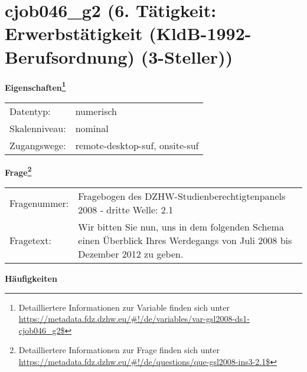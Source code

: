 
    \setcounter{footnote}{0}

    \vspace*{-1.8cm}
	\section{cjob046\_g2 (6. Tätigkeit: Erwerbstätigkeit (KldB-1992-Berufsordnung) (3-Steller))}
	\label{section:cjob046_g2}



    \vspace*{0.5cm}
    \noindent\textbf{Eigenschaften\footnote{Detailliertere Informationen zur Variable finden sich unter
		\url{https://metadata.fdz.dzhw.eu/\#!/de/variables/var-gsl2008-ds1-cjob046_g2$}}}\\
	\begin{tabularx}{\hsize}{@{}lX}
	Datentyp: & numerisch \\
	Skalenniveau: & nominal \\
	Zugangswege: &
	  remote-desktop-suf, 
	  onsite-suf
 \\
    \end{tabularx}



				\vspace*{0.5cm}
                \noindent\textbf{Frage\footnote{Detailliertere Informationen zur Frage finden sich unter
		              \url{https://metadata.fdz.dzhw.eu/\#!/de/questions/que-gsl2008-ins3-2.1$}}}\\
				\begin{tabularx}{\hsize}{@{}lX}
					Fragenummer: &
					  Fragebogen des DZHW-Studienberechtigtenpanels 2008 - dritte Welle:
					  2.1
 \\
					Fragetext: & Wir bitten Sie nun, uns in dem folgenden Schema einen Überblick Ihres Werdegangs von Juli 2008 bis Dezember 2012 zu geben. \\
				\end{tabularx}





        		\vspace*{0.5cm}
                \noindent\textbf{Häufigkeiten}

